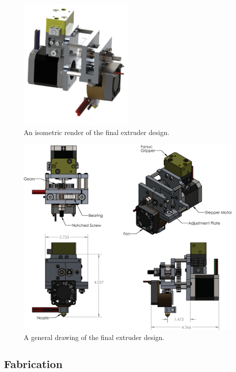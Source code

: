 \begin{figure}[h!]
\centering
\includegraphics[width=0.5\textwidth]{./figures/extruder-iso}
\caption{An isometric render of the final extruder design.}
\label{fig:extruder iso}
\end{figure}

\begin{figure}[h!]
\centering
\includegraphics[width=1\textwidth]{./figures/extruder-drawing}
\caption{A general drawing of the final extruder design.}
\label{fig:extruder drawing}
\end{figure}

\clearpage

\subsection{Fabrication}

